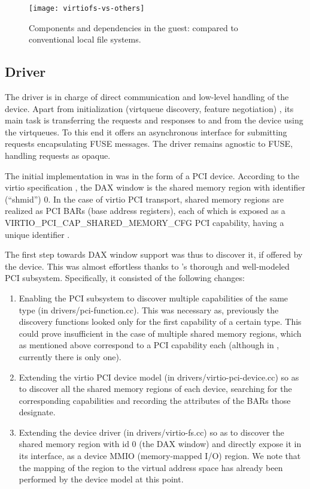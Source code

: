 \begin{figure}
    \centering
    \texttt{[image: virtiofs-vs-others]}
    \caption{Components and dependencies in the guest: \viofs{} compared to
        conventional local file systems.}
    \label{fig:virtiofs-vs-others}
\end{figure}

\subsection{Driver}

The \viofs{} driver is in charge of direct communication and low-level handling
of the device. Apart from initialization (virtqueue discovery, feature
negotiation) \cite{virtio}, its main task is transferring the requests and
responses to and from the device using the virtqueues. To this end it offers an
asynchronous interface for submitting requests encapsulating FUSE messages. The
driver remains agnostic to FUSE, handling requests as opaque.

The initial \viofs{} implementation in \qemu{} was in the form of a PCI device.
According to the virtio specification \cite{virtio}, the DAX window is the
shared memory region with identifier (``shmid'') 0. In the case of virtio PCI
transport, shared memory regions are realized as PCI BARs (base address
registers), each of which is exposed as a VIRTIO\_PCI\_CAP\_SHARED\_MEMORY\_CFG
PCI capability, having a unique identifier \cite{virtio, wiki:pci-conf,
osdev:pci}.

The first step towards DAX window support was thus to discover it, if offered
by the device. This was almost effortless thanks to \osv{}'s thorough and
well-modeled PCI subsystem. Specifically, it consisted of the following changes:
\begin{enumerate}
    \item Enabling the PCI subsystem to discover multiple capabilities of the
          same type (in drivers/pci-function.cc). This was necessary as,
          previously the discovery functions looked only for the first
          capability of a certain type. This could prove insufficient in the
          case of multiple shared memory regions, which as mentioned above
          correspond to a PCI capability each (although in \viofs{}, currently
          there is only one).
    \item Extending the virtio PCI device model (in
          drivers/virtio-pci-device.cc) so as to discover all the shared memory
          regions of each device, searching for the corresponding capabilities
          and recording the attributes of the BARs those designate.
    \item Extending the \viofs{} device driver (in drivers/virtio-fs.cc) so as
          to discover the shared memory region with id 0 (the DAX window) and
          directly expose it in its interface, as a device MMIO (memory-mapped
          I/O) region. We note that the mapping of the region to the virtual
          address space has already been performed by the device model at this
          point.
\end{enumerate}

